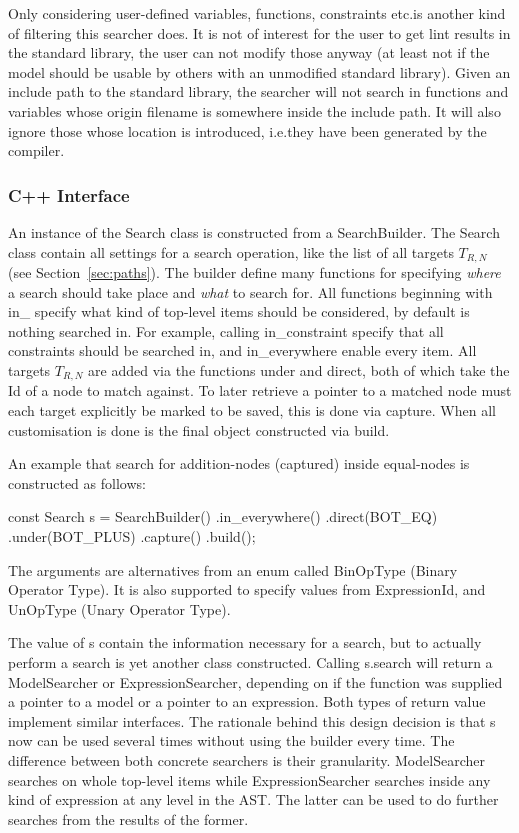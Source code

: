 \documentclass[a4paper,12pt]{article}
\newcommand{\cpp}[1]{\mbox{\mznfont #1}}
\begin{document}
Only considering user-defined variables, functions, constraints etc.\@ is another kind of
filtering this searcher does. It is not of interest for the user to get lint results in
the standard library, the user can not modify those anyway (at least not if the model should
be usable by others with an unmodified standard library). Given an include path to the
standard library, the searcher will not search in functions and variables whose origin
filename is somewhere inside the include path. It will also ignore those whose location is
introduced, i.e.\@ they have been generated by the compiler.

\subsubsection{C++ Interface}
\sloppy %

An instance of the \cpp{Search} class is constructed from a \cpp{SearchBuilder}. The
\cpp{Search} class contain all settings for a search operation, like the list of all
targets $T_{R,N}$ (see Section~\ref{sec:paths}). The
builder define many functions for specifying \emph{where} a search should take place and
\emph{what} to search for. All functions beginning with \cpp{in\_} specify what kind of
top-level items should be considered, by default is nothing searched in. For example, calling
\cpp{in\_constraint} specify that all constraints should be searched in, and
\cpp{in\_everywhere} enable every item.
All targets $T_{R,N}$ are added via the functions \cpp{under} and \cpp{direct}, both of
which take the Id of a node to match against. To later
retrieve a pointer to a matched node must each target explicitly be marked to
be saved, this is done via \cpp{capture}. When all
customisation is done is the final object constructed via \cpp{build}.

An example that search for addition-nodes (captured) inside equal-nodes is constructed as follows:
\begin{cppp}[style=nonumbers]
const Search s = SearchBuilder()
  .in_everywhere()
  .direct(BOT_EQ)
  .under(BOT_PLUS)
  .capture()
  .build();
\end{cppp}
The arguments are alternatives from an \cpp{enum} called \cpp{BinOpType} (Binary Operator Type).
It is also supported to specify values from \cpp{ExpressionId}, and \cpp{UnOpType} (Unary
Operator Type).

The value of \cpp{s} contain the information necessary for a search, but to actually
perform a search is yet another class constructed. Calling \cpp{s.search} will return a
\cpp{ModelSearcher} or \cpp{ExpressionSearcher}, depending on if the function was supplied
a pointer to a model or a pointer to an expression. Both types of return value implement
similar interfaces.
The rationale behind this design
decision is that \cpp{s} now can be used several times
without using the builder every time.
The difference between both concrete searchers is their granularity. \cpp{ModelSearcher}
searches on whole top-level items while \cpp{ExpressionSearcher} searches inside any kind
of expression at any level in the AST. The latter can be used to do further searches from
the results of the former.
\end{document}
